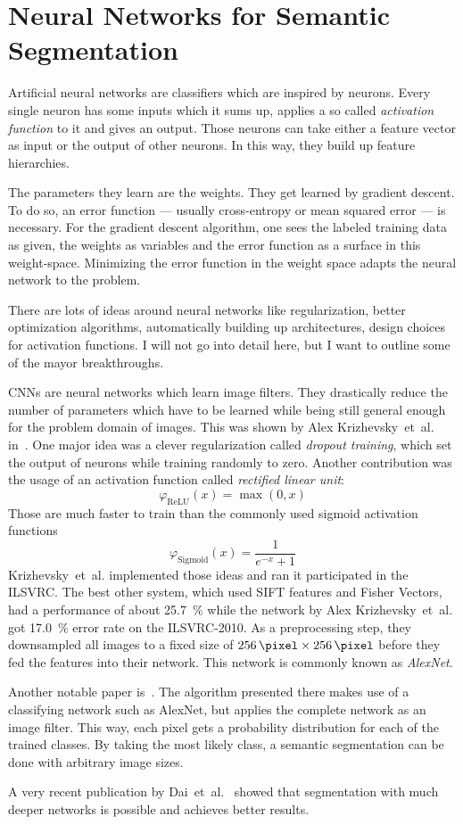 
\section{Neural Networks for Semantic Segmentation}\label{sec:nn}

Artificial neural networks are classifiers which are inspired by neurons.
Every single neuron has some inputs which it sums up, applies a so called
\textit{activation function} to it and gives an output. Those neurons can take
either a feature vector as input or the output of other neurons. In this way,
they build up feature hierarchies.

The parameters they learn are the weights. They get learned by gradient
descent. To do so, an error function --- usually cross-entropy or mean squared
error --- is necessary. For the gradient descent algorithm, one sees the
labeled training data as given, the weights as variables and the error function
as a surface in this weight-space. Minimizing the error function in the weight
space adapts the neural network to the problem.

There are lots of ideas around neural networks like regularization, better
optimization algorithms, automatically building up architectures, design
choices for activation functions. I will not go into detail here, but I want to
outline some of the mayor breakthroughs.

\Glspl{CNN} are neural networks which learn image filters. They drastically
reduce the number of parameters which have to be learned while being still
general enough for the problem domain of images. This was shown by Alex
Krizhevsky~et~al. in~\cite{krizhevsky2012imagenet}. One major idea was a clever
regularization called \textit{dropout training}, which set the output of neurons
while training randomly to zero. Another contribution was the usage of an activation
function called \textit{rectified linear unit}:
\[\varphi_{\text{ReLU}}(x) = \max(0, x)\]
Those are much faster to train than the commonly used sigmoid activation functions
\[\varphi_{\text{Sigmoid}}(x) = \frac{1}{e^{-x} + 1}\]
Krizhevsky~et~al. implemented those ideas and ran it participated in the
\gls{ILSVRC}. The best other system, which used SIFT features and Fisher
Vectors, had a performance of about \SI{25.7}{\percent} while the network by
Alex Krizhevsky~et~al. got \SI{17.0}{\percent} error rate on the ILSVRC-2010.
As a preprocessing step, they downsampled all images to a fixed
size of $\SI{256}{\pixel} \times \SI{256}{\pixel}$ before they fed the features
into their network. This network is commonly known as \textit{AlexNet}.

Another notable paper is~\cite{long2014fully}. The algorithm presented there
makes use of a classifying network such as AlexNet, but applies the complete
network as an image filter. This way, each pixel gets a probability
distribution for each of the trained classes. By taking the most likely class,
a semantic segmentation can be done with arbitrary image sizes.

A very recent publication by Dai~et~al.~\cite{dai2015instance} showed that
segmentation with much deeper networks is possible and achieves better results.
